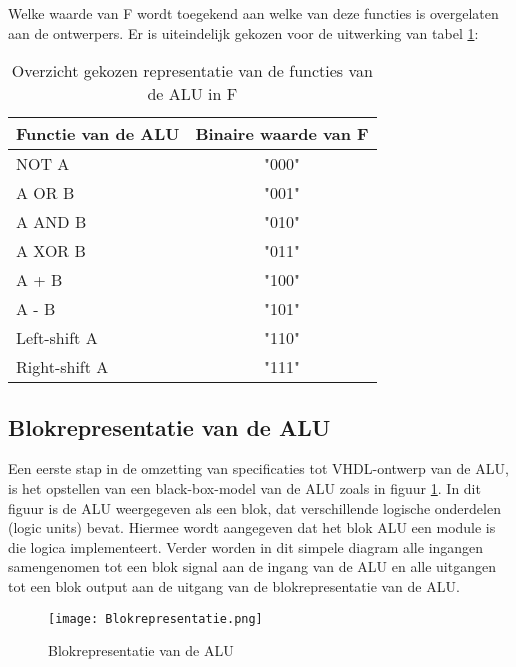 \documentclass[11pt,twoside,a4paper]{article}
\newenvironment{myitemize}
{ \begin{itemize}[topsep=1ex]
    \setlength{\itemsep}{5pt}
    \setlength{\parskip}{5pt}
    \setlength{\parsep}{5pt}     }
{ \end{itemize}                  }
\begin{document}
\begin{myitemize}
Welke waarde van F wordt toegekend aan welke van deze functies is overgelaten aan de ontwerpers. Er is uiteindelijk gekozen voor de uitwerking van tabel \ref{representatie}:\\
\begin{table}[H]
\begin{center}
\caption{Overzicht gekozen representatie van de functies van de ALU in F}
\label{representatie}
\begin{tabular}{|l | c |}
\hline
Functie van de ALU & Binaire waarde van F\\
\hline
NOT A & "000"\\
A OR B & "001"\\
A AND B & "010"\\
A XOR B & "011"\\
A + B & "100"\\
A - B & "101"\\
Left-shift A & "110"\\
Right-shift A & "111"\\
\hline
\end{tabular}
\end{center}
\end{table}
\end{myitemize}

\subsection{Blokrepresentatie van de ALU}
Een eerste stap in de omzetting van specificaties tot VHDL-ontwerp van de ALU, is het opstellen van een black-box-model van de ALU zoals in figuur \ref{Blokrepresentatie}. In dit figuur is de ALU weergegeven als een blok, dat verschillende logische onderdelen (logic units) bevat. Hiermee wordt aangegeven dat het blok ALU een module is die logica implementeert. Verder worden in dit simpele diagram alle ingangen samengenomen tot een blok signal aan de ingang van de ALU en alle uitgangen tot een blok output aan de uitgang van de blokrepresentatie van de ALU.
\begin{figure}[H]
\begin{center}
\texttt{[image: Blokrepresentatie.png]}
\caption{Blokrepresentatie van de ALU}
\label{Blokrepresentatie}
\end{center}
\end{figure}
\end{document}
